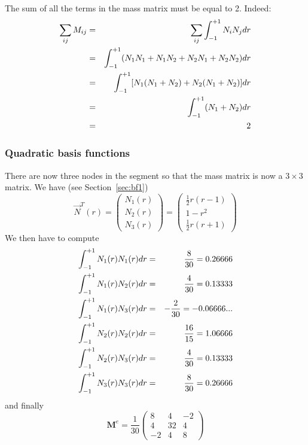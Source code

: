 \begin{remark} 
The sum of all the terms in the mass matrix must be equal to 2. Indeed:
\begin{eqnarray}
\sum_{ij} M_{ij} 
&=&\sum_{ij} \int_{-1}^{+1} N_i N_j dr \nonumber\\
&=&\int_{-1}^{+1} (N_1N_1+N_1N_2+N_2N_1+N_2N_2) dr\nonumber\\
&=&\int_{-1}^{+1} [N_1(N_1+N_2)+N_2(N_1+N_2)]dr\nonumber\\
&=&\int_{-1}^{+1} (N_1 + N_2) dr\nonumber\\
&=& 2\nonumber
\end{eqnarray}
\end{remark}


\subsubsection{Quadratic basis functions}
There are now three nodes in the segment so that the mass matrix 
is now a $3\times3$ matrix. We have (see Section~\ref{sec:bf1}) 
\begin{equation}
{\vec N}^T(r) = 
\left(
\begin{array}{c}
N_1(r) \\ 
N_2(r) \\ 
N_3(r) 
\end{array}
\right)
=
\left(
\begin{array}{c}
\frac{1}{2} r (r-1) \\
1-r^2 \\
\frac{1}{2} r (r+1) 
\end{array}
\right)
\end{equation}
We then have to compute
\begin{eqnarray}
\int_{-1}^{+1} N_1(r) N_1(r) dr &=& \frac{8}{30}  = 0.26666 \nonumber\\
\int_{-1}^{+1} N_1(r) N_2(r) dr &=& \frac{4}{30}  =0.13333  \nonumber\\
\int_{-1}^{+1} N_1(r) N_3(r) dr &=& -\frac{2}{30} =-0.06666...\nonumber\\ 
\int_{-1}^{+1} N_2(r) N_2(r) dr &=& \frac{16}{15} = 1.06666 \nonumber\\
\int_{-1}^{+1} N_2(r) N_3(r) dr &=& \frac{4}{30}  =0.13333 \nonumber\\
\int_{-1}^{+1} N_3(r) N_3(r) dr &=& \frac{8}{30} = 0.26666  \nonumber
\end{eqnarray}
and finally 
\begin{equation}
{\bm M}^e 
=
\frac{1}{30}
\left(
\begin{array}{ccc}
8  & 4 & -2 \\
4  & 32 & 4 \\
-2 & 4 & 8
\end{array}
\right)
\end{equation}


